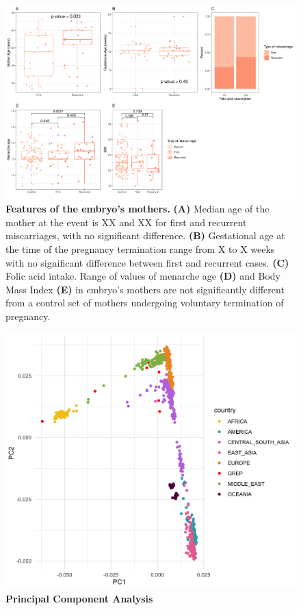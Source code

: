 \begin{figure}[ht]
\centering
\includegraphics[width=\linewidth]{fig/panel_stats.png}
\caption{\textbf{Features of the embryo's mothers.} \textbf{(A)} Median age of the mother at the event is XX and XX for first and recurrent miscarriages, with no significant difference. \textbf{(B)} Gestational age at the time of the pregnancy termination range from X to X weeks with no significant difference between first and recurrent cases.  \textbf{(C)} Folic acid intake. Range of values of menarche age \textbf{(D)} and Body Mass Index \textbf{(E)} in embryo's mothers are not significantly different from a control set of mothers undergoing voluntary termination of pregnancy.}
\label{fig:embryostats}
\end{figure}

\begin{figure}[ht]
    \centering
    \includegraphics[width= 14 cm, high= 16cm]{fig/pca_hgdp-grep_noALPHA.png}
    \caption{\textbf{Principal Component Analysis  }}
    \label{fig:pca}
\end{figure}


